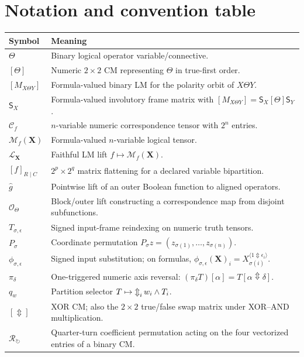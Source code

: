 \documentclass[11pt]{article}
\theoremstyle{definition}
\theoremstyle{remark}
\newcommand{\cC}{\mathcal C}
\newcommand{\cM}{\mathcal M}
\newcommand{\cO}{\mathcal O}
\newcommand{\xor}{\mathbin{\Updownarrow}}
\newcommand{\bigxor}{\mathop{\Updownarrow}\displaylimits}
\begin{document}
\section{Notation and convention table}

\begin{center}\small
\begin{tabular}{p{.25\linewidth}p{.64\linewidth}}
\toprule
Symbol & Meaning\\
\midrule
$\Theta$ & Binary logical operator variable/connective.\\
$[\Theta]$ & Numeric $2\times2$ CM representing $\Theta$ in true-first order.\\
$[M_{X\Theta Y}]$ & Formula-valued binary LM for the polarity orbit of $X\Theta Y$.\\
$\mathsf S_X$ & Formula-valued involutory frame matrix with $[M_{X\Theta Y}]=\mathsf S_X[\Theta]\mathsf S_Y$.\\
$\cC_f$ & $n$-variable numeric correspondence tensor with $2^n$ entries.\\
$\cM_f(\mathbf X)$ & Formula-valued $n$-variable logical tensor.\\
$\mathcal L_{\mathbf X}$ & Faithful LM lift $f\mapsto\cM_f(\mathbf X)$.\\
$[f]_{R\mid C}$ & $2^p\times2^q$ matrix flattening for a declared variable bipartition.\\
$\widehat g$ & Pointwise lift of an outer Boolean function to aligned operators.\\
$\cO_\Theta$ & Block/outer lift constructing a correspondence map from disjoint subfunctions.\\
$T_{\sigma,\epsilon}$ & Signed input-frame reindexing on numeric truth tensors.\\
$P_\sigma$ & Coordinate permutation $P_\sigma z=(z_{\sigma(1)},\ldots,z_{\sigma(n)})$.\\
$\phi_{\sigma,\epsilon}$ & Signed input substitution; on formulas, $\phi_{\sigma,\epsilon}(\mathbf X)_i=X_{\sigma(i)}^{\langle 1\xor\epsilon_i\rangle}$.\\
$\pi_\delta$ & One-triggered numeric axis reversal: $(\pi_\delta T)[\alpha]=T[\alpha\xor\delta]$.\\
$q_w$ & Partition selector $T\mapsto\bigxor_i w_i\land T_i$.\\
$[\Updownarrow]$ & XOR CM; also the $2\times2$ true/false swap matrix under XOR--AND multiplication.\\
$\mathcal R_{\circlearrowright}$ & Quarter-turn coefficient permutation acting on the four vectorized entries of a binary CM.\\
\bottomrule
\end{tabular}
\end{center}
\end{document}
